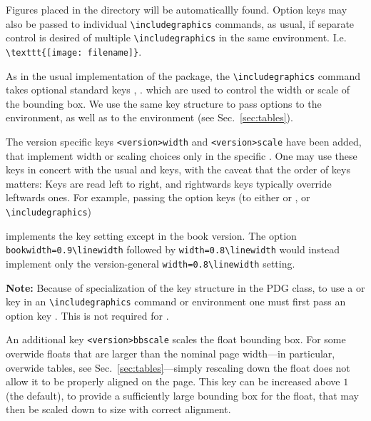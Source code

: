 Figures placed in the  directory will be automaticallly found. 
Option keys may also be passed to individual \lstinline{\includegraphics} commands,  
as usual, if separate control is desired of multiple \lstinline{\includegraphics} in the same  environment.
I.e. \lstinline!\texttt{[image: filename]}!.

\label{sec:ginkeys}
As in the usual implementation of the  package, the \lstinline{\includegraphics} command takes optional standard keys , .
which are used to control the width or scale of the bounding box. 
We use the same key structure to pass options to the  environment, as well as to the  environment (see Sec.~\ref{sec:tables}).

The version specific keys \lstinline!<version>width! and \lstinline!<version>scale! have been added, 
that implement width or scaling choices only in the specific .
One may use these keys in concert with the usual  and  keys, with the caveat that the order of keys matters: 
Keys are read left to right, and rightwards keys typically override leftwards ones. 
For example, passing the option keys (to either  or , or \lstinline{\includegraphics})
\begin{verbtex}
	[width=0.8\linewidth, bookwidth=0.9\linewidth]
\end{verbtex}
implements the  key setting except in the book version. 
The option \lstinline!bookwidth=0.9\linewidth! followed by
\lstinline!width=0.8\linewidth! would instead implement only the version-general \lstinline!width=0.8\linewidth! setting.

\textbf{Note:} Because of specialization of the  key structure in the PDG class,
to use a  or  key in an \lstinline{\includegraphics} command or  environment
one must first pass an option key . This is not required for  .

An additional key \lstinline!<version>bbscale! scales the float bounding box.
For some overwide floats that are larger than the nominal page width---in particular, overwide tables, see Sec.~\ref{sec:tables}---simply 
rescaling down the float does not allow it to be properly aligned on the page.
This key can be increased above $1$ (the default), to provide a sufficiently large bounding box for the float, that may then be scaled down to size with correct alignment.

